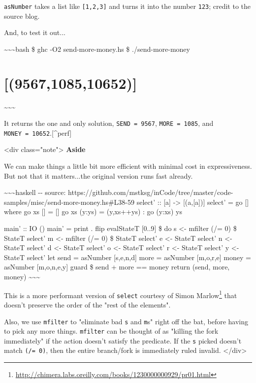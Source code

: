 \documentclass[]{article}
\renewcommand{\href}[2]{#2\footnote{\url{#1}}}
\begin{document}
\texttt{asNumber} takes a list like \texttt{{[}1,2,3{]}} and turns it into the
number \texttt{123}; credit to the source blog.

And, to test it out...

\textasciitilde{}\textasciitilde{}\textasciitilde{}bash \$ ghc -O2
send-more-money.hs \$ ./send-more-money

\section{{[}(9567,1085,10652){]}}

\textasciitilde{}\textasciitilde{}\textasciitilde{}

It returns the one and only solution, \texttt{SEND\ =\ 9567},
\texttt{MORE\ =\ 1085}, and \texttt{MONEY\ =\ 10652}.{[}\^{}perf{]}

\textless{}div class="note"\textgreater{} \textbf{Aside}

We can make things a little bit more efficient with minimal cost in
expressiveness. But not that it matters...the original version runs fast
already.

\textasciitilde{}\textasciitilde{}\textasciitilde{}haskell -\/- source:
https://github.com/mstksg/inCode/tree/master/code-samples/misc/send-more-money.hs\#L38-59
select' :: {[}a{]} -\textgreater{} {[}(a,{[}a{]}){]} select' = go {[}{]} where
go xs {[}{]} = {[}{]} go xs (y:ys) = (y,xs++ys) : go (y:xs) ys

main' :: IO () main' = print . flip evalStateT {[}0..9{]} \$ do s \textless{}-
mfilter (/= 0) \$ StateT select' m \textless{}- mfilter (/= 0) \$ StateT select'
e \textless{}- StateT select' n \textless{}- StateT select' d \textless{}-
StateT select' o \textless{}- StateT select' r \textless{}- StateT select' y
\textless{}- StateT select' let send = asNumber {[}s,e,n,d{]} more = asNumber
{[}m,o,r,e{]} money = asNumber {[}m,o,n,e,y{]} guard \$ send + more == money
return (send, more, money) \textasciitilde{}\textasciitilde{}\textasciitilde{}

This is a more performant version of \texttt{select}
\href{http://chimera.labs.oreilly.com/books/1230000000929/pr01.html}{courtesy of
Simon Marlow} that doesn't preserve the order of the "rest of the elements".

Also, we use \texttt{mfilter} to "eliminate bad \texttt{s} and \texttt{m}s"
right off the bat, before having to pick any more things. \texttt{mfilter} can
be thought of as "killing the fork immediately" if the action doesn't satisfy
the predicate. If the \texttt{s} picked doesn't match \texttt{(/=\ 0)}, then the
entire branch/fork is immediately ruled invalid. \textless{}/div\textgreater{}
\end{document}
